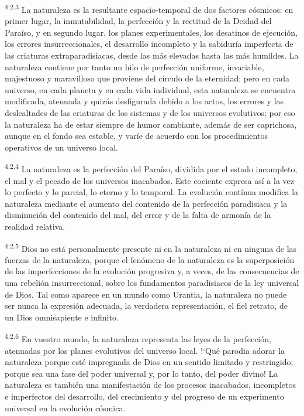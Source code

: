 \par
\textsuperscript{4:2.3} La naturaleza es la resultante espacio-temporal de dos factores cósmicos: en primer lugar, la inmutabilidad, la perfección y la rectitud de la Deidad del Paraíso, y en segundo lugar, los planes experimentales, los desatinos de ejecución, los errores insurreccionales, el desarrollo incompleto y la sabiduría imperfecta de las criaturas extraparadisiacas, desde las más elevadas hasta las más humildes. La naturaleza contiene por tanto un hilo de perfección uniforme, invariable, majestuoso y maravilloso que proviene del círculo de la eternidad; pero en cada universo, en cada planeta y en cada vida individual, esta naturaleza se encuentra modificada, atenuada y quizás desfigurada debido a los actos, los errores y las deslealtades de las criaturas de los sistemas y de los universos evolutivos; por eso la naturaleza ha de estar siempre de humor cambiante, además de ser caprichosa, aunque en el fondo sea estable, y varíe de acuerdo con los procedimientos operativos de un universo local.

\par
\textsuperscript{4:2.4} La naturaleza es la perfección del Paraíso, dividida por el estado incompleto, el mal y el pecado de los universos inacabados. Este cociente expresa así a la vez lo perfecto y lo parcial, lo eterno y lo temporal. La evolución contínua modifica la naturaleza mediante el aumento del contenido de la perfección paradisiaca y la disminución del contenido del mal, del error y de la falta de armonía de la realidad relativa.

\par
\textsuperscript{4:2.5} Dios no está personalmente presente ni en la naturaleza ni en ninguna de las fuerzas de la naturaleza, porque el fenómeno de la naturaleza es la superposición de las imperfecciones de la evolución progresiva y, a veces, de las consecuencias de una rebelión insurreccional, sobre los fundamentos paradisiacos de la ley universal de Dios. Tal como aparece en un mundo como Urantia, la naturaleza no puede ser nunca la expresión adecuada, la verdadera representación, el fiel retrato, de un Dios omnisapiente e infinito.

\par
\textsuperscript{4:2.6} En vuestro mundo, la naturaleza representa las leyes de la perfección, atenuadas por los planes evolutivos del universo local. !`Qué parodia adorar la naturaleza porque esté impregnada de Dios en un sentido limitado y restringido; porque sea una fase del poder universal y, por lo tanto, del poder divino! La naturaleza es también una manifestación de los procesos inacabados, incompletos e imperfectos del desarrollo, del crecimiento y del progreso de un experimento universal en la evolución cósmica.

